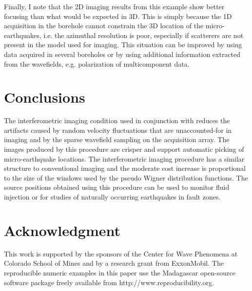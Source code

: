 
Finally, I note that the 2D imaging results from this example show
better focusing than what would be expected in 3D. This is simply
because the 1D acquisition in the borehole cannot constrain the 3D
location of the micro-earthquakes, i.e. the azimuthal resolution is
poor, especially if scatterers are not present in the model used for
imaging. This situation can be improved by using data acquired in
several boreholes or by using additional information extracted from
the wavefields, e.g. polarization of multicomponent data.

\section{Conclusions}

The interferometric imaging condition used in conjunction with
  reduces the
artifacts caused by random velocity fluctuations that are
unaccounted-for in imaging and by the sparse wavefield sampling on the
acquisition array. The images produced by this procedure are crisper
and support automatic picking of micro-earthquake
locations.  The
interferometric imaging procedure has a similar structure to
conventional imaging and the moderate cost increase is proportional to
the size of the windows used by the pseudo Wigner distribution
functions. The source positions obtained using this procedure can be
used to monitor fluid injection or for studies of naturally occurring
earthquakes in fault zones.

\section{Acknowledgment}
This work is supported by the sponsors of the Center for Wave
Phenomena at Colorado School of Mines and by a research grant from
ExxonMobil.
%
The reproducible numeric examples in this paper use the Madagascar
open-source software package freely available from
http://www.reproducibility.org.






